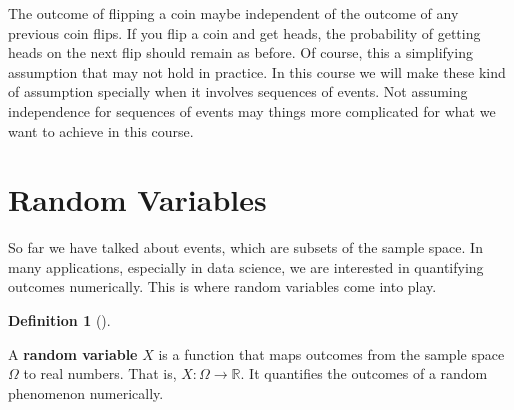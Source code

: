 \documentclass[
  letterpaper,
]{scrbook}
\theoremstyle{definition}
\newtheorem{definition}{Definition}[chapter]
\theoremstyle{plain}
\theoremstyle{plain}
\theoremstyle{definition}
\theoremstyle{remark}
\begin{document}
\begin{tcolorbox}[enhanced jigsaw, bottomtitle=1mm, coltitle=black, toprule=.15mm, toptitle=1mm, bottomrule=.15mm, colback=white, arc=.35mm, opacityback=0, breakable, title=\textcolor{quarto-callout-note-color}{\faInfo}\hspace{0.5em}{Note}, titlerule=0mm, rightrule=.15mm, colbacktitle=quarto-callout-note-color!10!white, colframe=quarto-callout-note-color-frame, opacitybacktitle=0.6, leftrule=.75mm, left=2mm]

The outcome of flipping a coin maybe independent of the outcome of any
previous coin flips. If you flip a coin and get heads, the probability
of getting heads on the next flip should remain as before. Of course,
this a simplifying assumption that may not hold in practice. In this
course we will make these kind of assumption specially when it involves
sequences of events. Not assuming independence for sequences of events
may things more complicated for what we want to achieve in this course.

\end{tcolorbox}

\section{Random Variables}\label{random-variables}

So far we have talked about events, which are subsets of the sample
space. In many applications, especially in data science, we are
interested in quantifying outcomes numerically. This is where random
variables come into play.

\begin{tcolorbox}[enhanced jigsaw, bottomtitle=1mm, coltitle=black, toprule=.15mm, toptitle=1mm, bottomrule=.15mm, colback=white, arc=.35mm, opacityback=0, breakable, title={Random Variable}, titlerule=0mm, rightrule=.15mm, colbacktitle=quarto-callout-note-color!10!white, colframe=quarto-callout-note-color-frame, opacitybacktitle=0.6, leftrule=.75mm, left=2mm]

\begin{definition}[]\protect\hypertarget{def-random-variable}{}\label{def-random-variable}

A \textbf{random variable} \(X\) is a function that maps outcomes from
the sample space \(\Omega\) to real numbers. That is,
\(X: \Omega \to \mathbb{R}\). It quantifies the outcomes of a random
phenomenon numerically.

\end{definition}

\end{tcolorbox}
\end{document}
